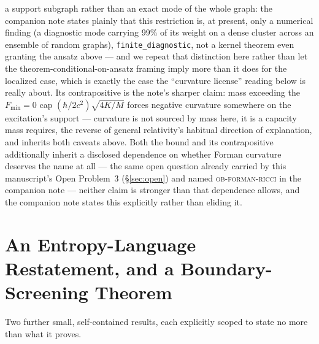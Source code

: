 \documentclass[10pt,twocolumn]{article}
\begin{document}
a support subgraph rather than an exact mode of the whole graph: the
companion note states plainly that this restriction is, at present, only a
numerical finding (a diagnostic mode carrying 99\% of its weight on a dense
cluster across an ensemble of random graphs), \texttt{finite\_diagnostic}, not
a kernel theorem even granting the ansatz above --- and we repeat that
distinction here rather than let the theorem-conditional-on-ansatz framing
imply more than it does for the localized case, which is exactly the case the
``curvature license'' reading below is really about.
Its contrapositive is the note's sharper claim: mass exceeding the
$F_{\min}=0$ cap $(\hbar/2c^2)\sqrt{4K/M}$ forces negative curvature
somewhere on the excitation's support --- curvature is not sourced by mass
here, it is a capacity mass requires, the reverse of general relativity's
habitual direction of explanation, and inherits both caveats above. Both the
bound and its contrapositive additionally inherit a disclosed dependence on
whether Forman curvature deserves the name at all --- the same open question
already carried by this manuscript's Open Problem~3 (\S\ref{sec:open}) and
named \textsc{ob-forman-ricci} in the companion note --- neither claim is
stronger than that dependence allows, and the companion note states this
explicitly rather than eliding it.

\section{An Entropy-Language Restatement, and a Boundary-Screening Theorem}
\label{sec:entropyscreen}
Two further small, self-contained results, each explicitly scoped to state
no more than what it proves.
\end{document}
